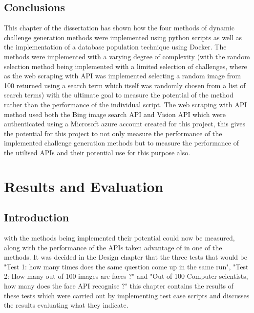 \documentclass[12pt,a4paper]{article}
\begin{document}
\subsection{Conclusions}
This chapter of the dissertation has shown how the four methods of dynamic challenge generation methods were implemented using python scripts as well as the implementation of a database population technique using Docker. The methods were implemented with a varying degree of complexity (with the random selection method being implemented with a limited selection of challenges, where as the web scraping with API was implemented selecting a random image from 100 returned using a search term which itself was randomly chosen from a list of search terms) with the ultimate goal to measure the potential of the method rather than the performance of the individual script. The web scraping with API method used both the Bing image search API and Vision API which were authenticated using a Microsoft azure account created for this project, this gives the potential for this project to not only measure the performance of the implemented challenge generation methods but to measure the performance of the utilised APIs and their potential use for this purpose also.

\newpage
\section{Results and Evaluation} 
\subsection{Introduction}
with the methods being implemented their potential could now be measured, along with the performance of the APIs taken advantage of in one of the methods. It was decided in the Design chapter that the three tests that would be "Test 1: how many times does the same question come up in the same run", "Test 2: How many out of 100 images are faces ?" and "Out of 100 Computer scientists, how many does the face API recognise ?" this chapter contains the results of these tests which were carried out by implementing test case scripts and discusses the results evaluating what they indicate.  
\end{document}
